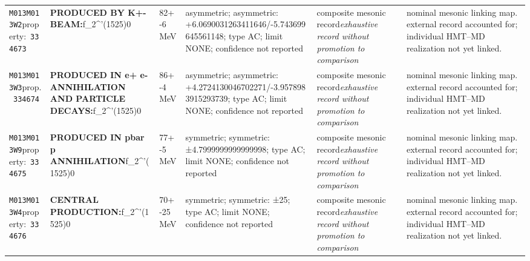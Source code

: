 \begin{landscape}
\begin{longtable}{L{1.85cm}L{4.45cm}L{2.35cm}L{4.05cm}L{3.35cm}L{7.15cm}}
\texttt{M013}\newline \texttt{M013W2}\newline property:\ \texttt{334673} & \textbf{PRODUCED BY K+- BEAM:}\newline f\_\allowbreak{}2\textasciicircum{}'(1525)0 & 82+-6\,MeV & asymmetric; asymmetric: +6.0690031263411646/-5.743699645561148; type AC; limit NONE; confidence not reported & composite mesonic record\newline \emph{exhaustive record without promotion to comparison} & nominal mesonic linking map. external record accounted for; individual HMT--MD realization not yet linked. \\
\texttt{M013}\newline \texttt{M013W3}\newline prop.\ \texttt{334674} & \textbf{PRODUCED IN e+ e- ANNIHILATION AND PARTICLE DECAYS:}\newline f\_\allowbreak{}2\textasciicircum{}'(1525)0 & 86+-4\,MeV & asymmetric; asymmetric: +4.2724130046702271/-3.9578983915293739; type AC; limit NONE; confidence not reported & composite mesonic record\newline \emph{exhaustive record without promotion to comparison} & nominal mesonic linking map. external record accounted for; individual HMT--MD realization not yet linked. \\
\texttt{M013}\newline \texttt{M013W9}\newline property:\ \texttt{334675} & \textbf{PRODUCED IN pbar p ANNIHILATION}\newline f\_\allowbreak{}2\textasciicircum{}'(1525)0 & 77+-5\,MeV & symmetric; symmetric: ±4.7999999999999998; type AC; limit NONE; confidence not reported & composite mesonic record\newline \emph{exhaustive record without promotion to comparison} & nominal mesonic linking map. external record accounted for; individual HMT--MD realization not yet linked. \\
\texttt{M013}\newline \texttt{M013W4}\newline property:\ \texttt{334676} & \textbf{CENTRAL PRODUCTION:}\newline f\_\allowbreak{}2\textasciicircum{}'(1525)0 & 70+-25\,MeV & symmetric; symmetric: ±25; type AC; limit NONE; confidence not reported & composite mesonic record\newline \emph{exhaustive record without promotion to comparison} & nominal mesonic linking map. external record accounted for; individual HMT--MD realization not yet linked. \\

\end{longtable}
\end{landscape}
